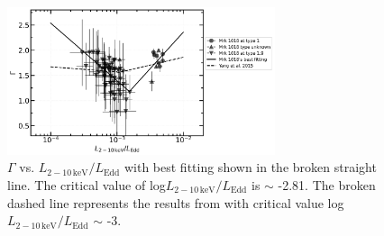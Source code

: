\documentclass[twocolumn]{aastex63}
\begin{document}
\begin{figure}
\centering
	\includegraphics[width=0.7\textwidth]{./pic/xrayappendgood-errorbar-Lrate-g-tmap_brokenlinear_dot.png}
    \caption{$\Gamma$ vs. $L_\mathrm{2-10\,keV}/L_\mathrm{Edd}$ with best fitting shown in the broken straight line. The critical value of log$L_\mathrm{2-10\,keV}/L_\mathrm{Edd}$ is $\sim$ -2.81. The broken dashed line represents the results from \citet{2015MNRAS.447.1692Y} with critical value log$L_\mathrm{2-10\,keV}/L_\mathrm{Edd}$ $\sim$ -3. }
    \label{fig:xrayappendgood-Lrateandg-tmap}
\end{figure}
\end{document}
